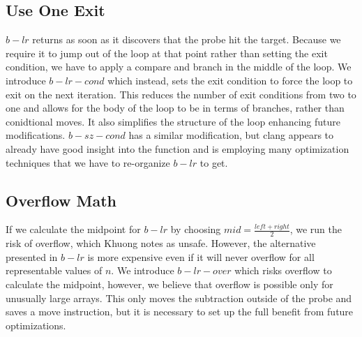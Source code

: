 \documentclass[twocolumn]{article}
\begin{document}
\begin{figure}[t]
\end{figure}

\subsection{Use One Exit}
$b-lr$ returns as soon as it discovers that the probe hit the target. Because we require it to jump out of the loop at that point rather than setting the exit condition, we have to apply a compare and branch in the middle of the loop. We introduce $b-lr-cond$ which instead, sets the exit condition to force the loop to exit on the next iteration. This reduces the number of exit conditions from two to one and allows for the body of the loop to be in terms of branches, rather than conidtional moves. It also simplifies the structure of the loop enhancing future modifications. $b-sz-cond$ has a similar modification, but clang appears to already have good insight into the function and is employing many optimization techniques that we have to re-organize $b-lr$ to get.

\subsection{Overflow Math}
If we calculate the midpoint for $b-lr$ by choosing $mid = \frac{left+right}{2}$, we run the risk of overflow, which Khuong notes as unsafe. \cite{pvk-search-retro} However, the alternative presented in $b-lr$ is more expensive even if it will never overflow for all representable values of $n$. We introduce $b-lr-over$ which risks overflow to calculate the midpoint, however, we believe that overflow is possible only for unusually large arrays. This only moves the subtraction outside of the probe and saves a move instruction, but it is necessary to set up the full benefit from future optimizations.
\end{document}
